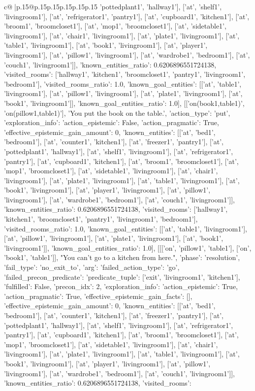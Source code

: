\documentclass{article}
\begin{document}
{\begin{supertabular}{c@{$\;$}|p{.15\linewidth}@{}p{.15\linewidth}p{.15\linewidth}p{.15\linewidth}p{.15\linewidth}p{.15\linewidth}}
{{{'pottedplant1', 'hallway1'], ['at', 'shelf1', 'livingroom1'], ['at', 'refrigerator1', 'pantry1'], ['at', 'cupboard1', 'kitchen1'], ['at', 'broom1', 'broomcloset1'], ['at', 'mop1', 'broomcloset1'], ['at', 'sidetable1', 'livingroom1'], ['at', 'chair1', 'livingroom1'], ['at', 'plate1', 'livingroom1'], ['at', 'table1', 'livingroom1'], ['at', 'book1', 'livingroom1'], ['at', 'player1', 'livingroom1'], ['at', 'pillow1', 'livingroom1'], ['at', 'wardrobe1', 'bedroom1'], ['at', 'couch1', 'livingroom1']], 'known_entities_ratio': 0.6206896551724138, 'visited_rooms': ['hallway1', 'kitchen1', 'broomcloset1', 'pantry1', 'livingroom1', 'bedroom1'], 'visited_rooms_ratio': 1.0, 'known_goal_entities': [['at', 'table1', 'livingroom1'], ['at', 'pillow1', 'livingroom1'], ['at', 'plate1', 'livingroom1'], ['at', 'book1', 'livingroom1']], 'known_goal_entities_ratio': 1.0}}], [['on(book1,table1)', 'on(pillow1,table1)'], 'You put the book on the table.', {'action_type': 'put', 'exploration_info': {'action_epistemic': False, 'action_pragmatic': True, 'effective_epistemic_gain_amount': 0, 'known_entities': [['at', 'bed1', 'bedroom1'], ['at', 'counter1', 'kitchen1'], ['at', 'freezer1', 'pantry1'], ['at', 'pottedplant1', 'hallway1'], ['at', 'shelf1', 'livingroom1'], ['at', 'refrigerator1', 'pantry1'], ['at', 'cupboard1', 'kitchen1'], ['at', 'broom1', 'broomcloset1'], ['at', 'mop1', 'broomcloset1'], ['at', 'sidetable1', 'livingroom1'], ['at', 'chair1', 'livingroom1'], ['at', 'plate1', 'livingroom1'], ['at', 'table1', 'livingroom1'], ['at', 'book1', 'livingroom1'], ['at', 'player1', 'livingroom1'], ['at', 'pillow1', 'livingroom1'], ['at', 'wardrobe1', 'bedroom1'], ['at', 'couch1', 'livingroom1']], 'known_entities_ratio': 0.6206896551724138, 'visited_rooms': ['hallway1', 'kitchen1', 'broomcloset1', 'pantry1', 'livingroom1', 'bedroom1'], 'visited_rooms_ratio': 1.0, 'known_goal_entities': [['at', 'table1', 'livingroom1'], ['at', 'pillow1', 'livingroom1'], ['at', 'plate1', 'livingroom1'], ['at', 'book1', 'livingroom1']], 'known_goal_entities_ratio': 1.0}}], [[['on', 'pillow1', 'table1'], ['on', 'book1', 'table1']], "You can't go to a kitchen from here.", {'phase': 'resolution', 'fail_type': 'no_exit_to', 'arg': {'failed_action_type': 'go', 'failed_precon_predicate': {'predicate_tuple': ['exit', 'livingroom1', 'kitchen1'], 'fulfilled': False, 'precon_idx': 2}}, 'exploration_info': {'action_epistemic': True, 'action_pragmatic': True, 'effective_epistemic_gain_facts': [], 'effective_epistemic_gain_amount': 0, 'known_entities': [['at', 'bed1', 'bedroom1'], ['at', 'counter1', 'kitchen1'], ['at', 'freezer1', 'pantry1'], ['at', 'pottedplant1', 'hallway1'], ['at', 'shelf1', 'livingroom1'], ['at', 'refrigerator1', 'pantry1'], ['at', 'cupboard1', 'kitchen1'], ['at', 'broom1', 'broomcloset1'], ['at', 'mop1', 'broomcloset1'], ['at', 'sidetable1', 'livingroom1'], ['at', 'chair1', 'livingroom1'], ['at', 'plate1', 'livingroom1'], ['at', 'table1', 'livingroom1'], ['at', 'book1', 'livingroom1'], ['at', 'player1', 'livingroom1'], ['at', 'pillow1', 'livingroom1'], ['at', 'wardrobe1', 'bedroom1'], ['at', 'couch1', 'livingroom1']], 'known_entities_ratio': 0.6206896551724138, 'visited_rooms': }}}
\end{supertabular}}
\end{document}

